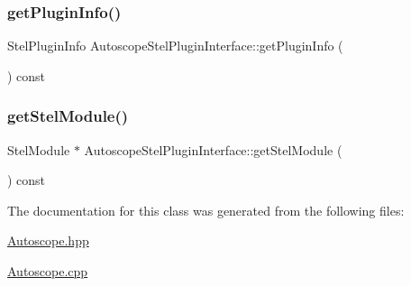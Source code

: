 \subsubsection{\texorpdfstring{getPluginInfo()}{getPluginInfo()}}
{\footnotesize\ttfamily Stel\+Plugin\+Info Autoscope\+Stel\+Plugin\+Interface\+::get\+Plugin\+Info (\begin{DoxyParamCaption}{ }\end{DoxyParamCaption}) const\hspace{0.3cm}{\ttfamily [virtual]}}

\mbox{\label{class_autoscope_stel_plugin_interface_a681456cfd440703d70f3fbf1b5a07887}} 
\subsubsection{\texorpdfstring{getStelModule()}{getStelModule()}}
{\footnotesize\ttfamily Stel\+Module $\ast$ Autoscope\+Stel\+Plugin\+Interface\+::get\+Stel\+Module (\begin{DoxyParamCaption}{ }\end{DoxyParamCaption}) const\hspace{0.3cm}{\ttfamily [virtual]}}



The documentation for this class was generated from the following files\+:\begin{DoxyCompactItemize}
\item 
\mbox{\hyperlink{_autoscope_8hpp}{Autoscope.\+hpp}}\item 
\mbox{\hyperlink{_autoscope_8cpp}{Autoscope.\+cpp}}\end{DoxyCompactItemize}

